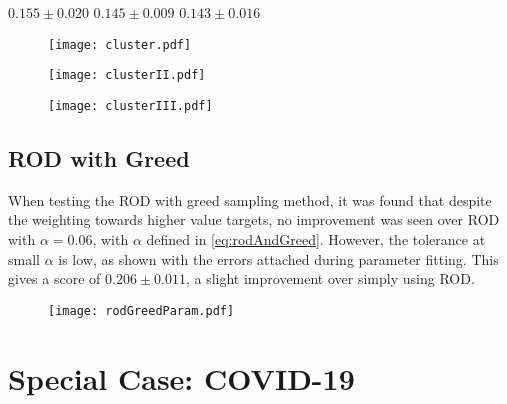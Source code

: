 ${0.155\pm{}0.020}$
${0.145\pm{}0.009}$
${0.143\pm{}0.016}$

\begin{figure}[H]
    \begin{center}
        \texttt{[image: cluster.pdf]}
    \end{center}
\end{figure}
\begin{figure}[H]
    \begin{center}
        \texttt{[image: clusterII.pdf]}
    \end{center}
\end{figure}
\begin{figure}[H]
    \begin{center}
        \texttt{[image: clusterIII.pdf]}
    \end{center}
\end{figure}
\subsection{ROD with Greed}
When testing the ROD with greed sampling method, it was found that despite the weighting towards higher value targets, no improvement was seen over ROD with $\alpha{}=0.06$, with $\alpha$ defined in \ref{eq:rodAndGreed}. However, the tolerance at small $\alpha$ is low, as shown with the errors attached during parameter fitting. This gives a score of ${0.206\pm{}0.011}$, a slight improvement over simply using ROD.

\begin{figure}[H]
    \begin{center}
        \texttt{[image: rodGreedParam.pdf]}
    \end{center}
\end{figure}

\section{Special Case: COVID-19}